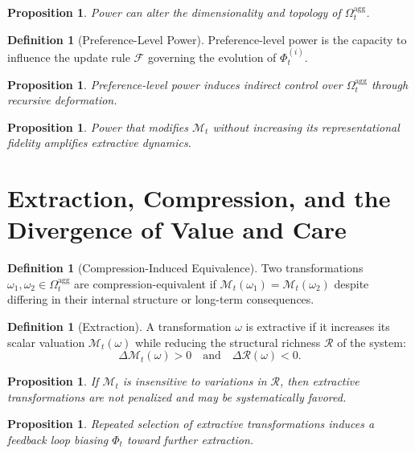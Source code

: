 \documentclass[11pt,a4paper]{article}
\newtheorem{proposition}[theorem]{Proposition}
\theoremstyle{definition}
\newtheorem{definition}[theorem]{Definition}
\theoremstyle{remark}
\begin{document}
\begin{proposition}
Power can alter the dimensionality and topology of $\Omega_t^{\mathrm{agg}}$.
\end{proposition}

\begin{definition}[Preference-Level Power]
Preference-level power is the capacity to influence the update rule $\mathcal{F}$ governing the evolution of $\Phi_t^{(i)}$.
\end{definition}

\begin{proposition}
Preference-level power induces indirect control over $\Omega_t^{\mathrm{agg}}$ through recursive deformation.
\end{proposition}

\begin{proposition}
Power that modifies $\mathcal{M}_t$ without increasing its representational fidelity amplifies extractive dynamics.
\end{proposition}

\section{Extraction, Compression, and the Divergence of Value and Care}

\begin{definition}[Compression-Induced Equivalence]
Two transformations $\omega_1, \omega_2 \in \Omega_t^{\mathrm{agg}}$ are compression-equivalent if $\mathcal{M}_t(\omega_1) = \mathcal{M}_t(\omega_2)$ despite differing in their internal structure or long-term consequences.
\end{definition}

\begin{definition}[Extraction]
A transformation $\omega$ is extractive if it increases its scalar valuation $\mathcal{M}_t(\omega)$ while reducing the structural richness $\mathcal{R}$ of the system:
\[
\Delta \mathcal{M}_t(\omega) > 0 \quad \text{and} \quad \Delta \mathcal{R}(\omega) < 0.
\]
\end{definition}

\begin{proposition}
If $\mathcal{M}_t$ is insensitive to variations in $\mathcal{R}$, then extractive transformations are not penalized and may be systematically favored.
\end{proposition}

\begin{proposition}
Repeated selection of extractive transformations induces a feedback loop biasing $\Phi_t$ toward further extraction.
\end{proposition}
\end{document}
